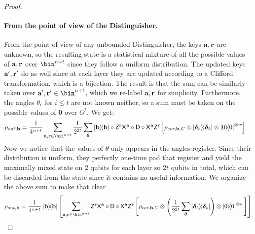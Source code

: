 \begin{proof}
    \paragraph{From the point of view of the Distinguisher.}
    From the point of view of any unbounded Distinguisher, the keys $\mathbf a, \mathbf r$ are unknown, so the resulting state is a statistical mixture of all the possible values of $\mathbf a, \mathbf r$ over $\bin^{n+t}$ since they follow a uniform distribution. The updated keys $\mathbf a', \mathbf r'$ do as well since at each layer they are updated according to a Clifford transformation, which is a bijection. The result is that the sum can be similarly taken over $\a', \r'\in\bin^{n+t}$, which we re-label $\mathbf a, \mathbf r$ for simplicity. Furthermore, the angles $\theta_i$ for $i\leq t$ are not known neither, so a sum must be taken on the possible values of $\boldsymbol{\theta}$ over $\Theta^{t}$.
        We get:
        \begin{align}
            \rho_{out, \b}&=
            \dfrac{1}{4^{n+t}}
            \sum_{\a, \r\in \bin^{n+t}}
            \dfrac{1}{2^{2t}}
            \sum_{\boldsymbol{\theta}}
            \ketbra\b
            \circ
            \Dec{\a}{\r}
            \circ
            \D
            \circ
            \Enc{\a}{\r}
            \left[
                \rho_{cor, \b, C}
                \otimes
            \ketbra{\boldsymbol\delta_{b}}
            \otimes
            \ketbra{0}^{\otimes w}
            \right]
        \end{align}
        Now we notice that the values of $\theta$ only appears in the angles register. Since their distribution is uniform, they perfectly one-time pad that register and yield the maximally mixed state on $2$ qubits for each layer so $2t$ qubits in total, which can be discarded from the state since it contains no useful information. We organize the above sum to make that clear
        \begin{align}
            \rho_{out, \b}
            &=
            \dfrac{1}{4^{n+t}}
            \ketbra\b
            \left[
                \sum_{\a, \r\in \bin^{n+t}}
                \Dec{\a}{\r}
                \circ
                \D
                \circ
                \Enc{\a}{\r}
                \left[
                    \rho_{cor, \b, C}
                    \otimes
                \left( \dfrac{1}{2^{2t}}
                \sum_{\boldsymbol{\theta}}
                \ketbra{\boldsymbol\delta_{b}} \right)
                \otimes
                \ketbra{0}^{\otimes w}
                \right]
            \right]
            \\

\end{align}
\end{proof}
